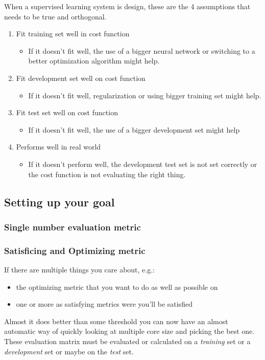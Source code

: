 When a supervised learning system is design, these are the 4 assumptions that needs to be true and orthogonal.
\begin{enumerate}
    \item Fit training set well in cost function
    \begin{itemize}
        \item If it doesn't fit well, the use of a bigger neural network or switching to a better optimization algorithm might help.
    \end{itemize}
    \item Fit development set well on cost function
    \begin{itemize}
        \item If it doesn't fit well, regularization or using bigger training set might help.
    \end{itemize}
    \item Fit test set well on cost function
    \begin{itemize}
        \item If it doesn't fit well, the use of a bigger development set might help
    \end{itemize}
    \item Performs well in real world
    \begin{itemize}
        \item If it doesn’t perform well, the development test set is not set correctly or the cost function is not evaluating the right thing.
    \end{itemize}
\end{enumerate}

\subsection{Setting up your goal}
\subsubsection{Single number evaluation metric}
\subsubsection{Satisficing and Optimizing metric} If there are multiple things you care about, e.g.: 
\begin{itemize}
    \item the optimizing metric that you want to do as well as possible on
    \item one or more as satisfying metrics were you'll be satisfied
\end{itemize}
Almost it does better than some threshold you can now have an almost automatic way of quickly looking at multiple core size and picking the best one. 
These evaluation matrix must be evaluated or calculated on a \textit{training} set or a \textit{development} set or maybe on the \textit{test} set.

